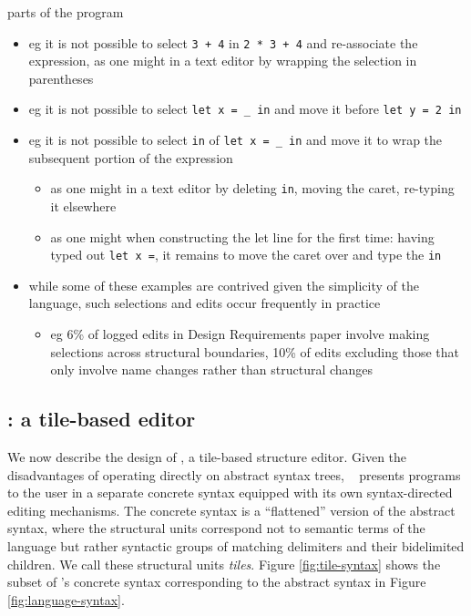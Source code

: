 \begin{itemize}
  parts of the program
  \begin{itemize}
    \item eg it is not possible to select \texttt{3 + 4} in \texttt{2 * 3 + 4}
      and re-associate the expression, as one might in a text editor by
      wrapping the selection in parentheses
    \item eg it is not possible to select \texttt{let x = \_ in} and
      move it before \texttt{let y = 2 in}
    \item eg it is not possible to select \texttt{in} of \texttt{let x = \_ in}
      and move it to wrap the subsequent portion of the expression
    \begin{itemize}
      \item as one might in a text editor by deleting \texttt{in},
        moving the caret, re-typing it elsewhere
      \item as one might when constructing the let line for the first time:
        having typed out \texttt{let x =}, it remains to move the caret over
        and type the \texttt{in}
    \end{itemize}
    \item while some of these examples are contrived given the simplicity of
      the language, such selections and edits occur frequently in practice
    \begin{itemize}
      \item eg 6\% of logged edits in Design Requirements
        paper involve making
        selections across structural boundaries, 10\% of edits excluding those
        that only involve name changes rather than structural changes
    \end{itemize}
  \end{itemize}
\end{itemize}

\subsection{\tylr: a tile-based editor}

We now describe the design of \tylr, a tile-based structure
editor.
Given the disadvantages of operating directly on abstract syntax
trees, \tylr~ presents programs to the user in a separate
concrete syntax equipped with its own syntax-directed editing
mechanisms.
The concrete syntax is a ``flattened'' version of the abstract
syntax, where the structural units correspond not to semantic
terms of the language but rather syntactic groups of matching
delimiters and their bidelimited children.
We call these structural units \emph{tiles}.
Figure \ref{fig:tile-syntax} shows the subset of \tylr's
concrete syntax corresponding to the abstract syntax in
Figure \ref{fig:language-syntax}.


